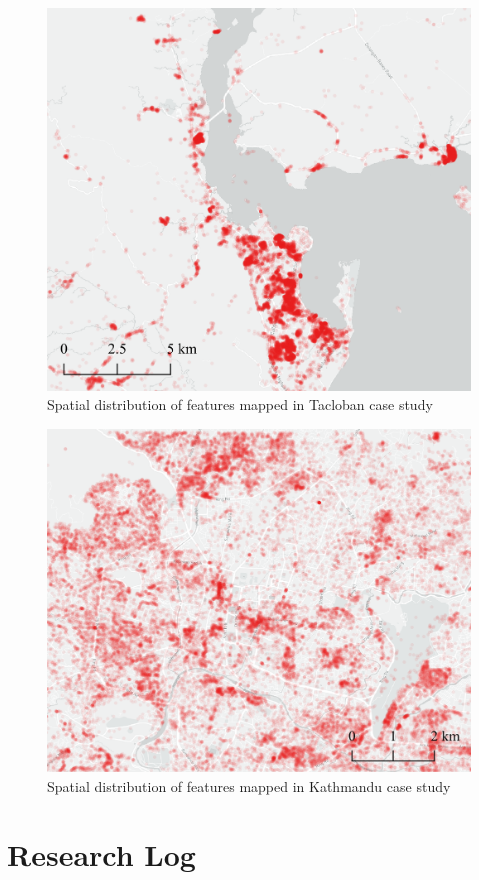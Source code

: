 \begin{figure} %
    \centering %
    \includegraphics[width = \textwidth]{Images/tac_2.png} %
    \caption{Spatial distribution of features mapped in Tacloban case study} %
\end{figure}

\begin{figure} %
    \centering %
    \includegraphics[width = \textwidth]{Images/nep_2.png} %
    \caption{Spatial distribution of features mapped in Kathmandu case study} %
\end{figure}
\chapter{Research Log}
\label{appendixlabel2}


